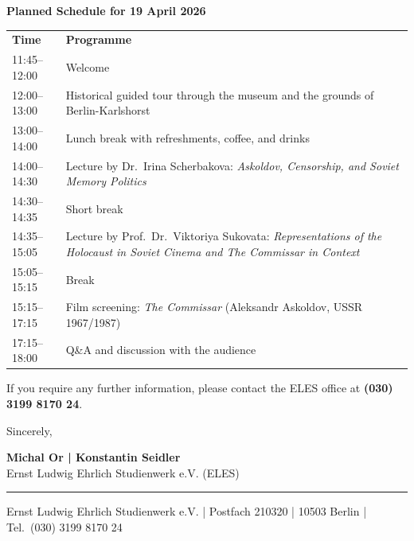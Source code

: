 \documentclass[11pt,a4paper]{article}
\newcommand{\InvitingOrg}{Ernst Ludwig Ehrlich Studienwerk e.V. (ELES)}
\newcommand{\ContactNames}{Michal Or | Konstantin Seidler}
\newcommand{\ContactPhone}{(030) 3199 8170 24}
\newcommand{\OfficeAddress}{Ernst Ludwig Ehrlich Studienwerk e.V. | Postfach 210320 | 10503 Berlin}
\begin{document}
\vspace{8pt}
\textbf{Planned Schedule for 19 April 2026}

\small
\renewcommand{\arraystretch}{1.08}
\begin{tabularx}{\textwidth}{@{}p{2.8cm}X@{}}
\textbf{Time} & \textbf{Programme} \\
11:45--12:00 & Welcome \\
12:00--13:00 & Historical guided tour through the museum and the grounds of Berlin-Karlshorst \\
13:00--14:00 & Lunch break with refreshments, coffee, and drinks \\
14:00--14:30 & Lecture by Dr.\ Irina Scherbakova: \emph{Askoldov, Censorship, and Soviet Memory Politics} \\
14:30--14:35 & Short break \\
14:35--15:05 & Lecture by Prof.\ Dr.\ Viktoriya Sukovata: \emph{Representations of the Holocaust in Soviet Cinema and The Commissar in Context} \\
15:05--15:15 & Break \\
15:15--17:15 & Film screening: \emph{The Commissar} (Aleksandr Askoldov, USSR 1967/1987) \\
17:15--18:00 & Q\&A and discussion with the audience \\
\end{tabularx}
\normalsize

If you require any further information, please contact the ELES office at \textbf{\ContactPhone}.

\vspace{10pt}

Sincerely,

\vspace{14pt}

\textbf{\ContactNames}\\
\InvitingOrg

\vfill
\hrule
\vspace{4pt}
\small
\OfficeAddress{} | Tel.\ \ContactPhone
\end{document}
